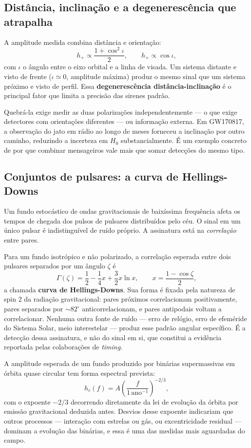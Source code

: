 \documentclass[11pt,a4paper]{article}
\begin{document}
\subsection*{Distância, inclinação e a degenerescência que atrapalha}

A amplitude medida combina distância e orientação:
\[
h_+\propto\frac{1+\cos^{2}\iota}{2},
\qquad
h_\times\propto\cos\iota,
\]
com $\iota$ o ângulo entre o eixo orbital e a linha de visada. Um sistema distante e visto de frente ($\iota\simeq0$, amplitude máxima) produz o mesmo sinal que um sistema próximo e visto de perfil. Essa \textbf{degenerescência distância-inclinação} é o principal fator que limita a precisão das sirenes padrão.

Quebrá-la exige medir as duas polarizações independentemente --- o que exige detectores com orientações diferentes --- ou informação externa. Em GW170817, a observação do jato em rádio ao longo de meses forneceu a inclinação por outro caminho, reduzindo a incerteza em $H_0$ substancialmente. É um exemplo concreto de por que combinar mensageiros vale mais que somar detecções do mesmo tipo.

\subsection*{Conjuntos de pulsares: a curva de Hellings-Downs}

Um fundo estocástico de ondas gravitacionais de baixíssima frequência afeta os tempos de chegada dos pulsos de pulsares distribuídos pelo céu. O sinal em um único pulsar é indistinguível de ruído próprio. A assinatura está na \emph{correlação} entre pares.

Para um fundo isotrópico e não polarizado, a correlação esperada entre dois pulsares separados por um ângulo $\zeta$ é
\[
\Gamma(\zeta)=\frac{1}{2}-\frac{1}{4}x+\frac{3}{2}x\ln x,
\qquad
x=\frac{1-\cos\zeta}{2},
\]
a chamada \textbf{curva de Hellings-Downs}. Sua forma é fixada pela natureza de spin 2 da radiação gravitacional: pares próximos correlacionam positivamente, pares separados por $\sim82^\circ$ anticorrelacionam, e pares antipodais voltam a correlacionar. Nenhuma outra fonte de ruído --- erro de relógio, erro de efeméride do Sistema Solar, meio interestelar --- produz esse padrão angular específico. É a detecção dessa assinatura, e não do sinal em si, que constitui a evidência reportada pelas colaborações de \textit{timing}.

A amplitude esperada de um fundo produzido por binárias supermassivas em órbita quase circular tem forma espectral prevista:
\[
h_c(f)=A\left(\frac{f}{1\,\mathrm{ano^{-1}}}\right)^{-2/3},
\]
com o expoente $-2/3$ decorrendo diretamente da lei de evolução da órbita por emissão gravitacional deduzida antes. Desvios desse expoente indicariam que outros processos --- interação com estrelas ou gás, ou excentricidade residual --- dominam a evolução das binárias, e essa é uma das medidas mais aguardadas do campo.
\end{document}
